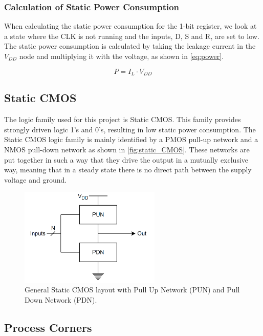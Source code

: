\subsubsection{Calculation of Static Power Consumption}
When calculating the static power consumption for the 1-bit register, we look at a state where the CLK is not running and the inputs, D, S and R, are set to low. The static power consumption is calculated by taking the leakage current in the $V_{DD}$ node and multiplying it with the voltage, as shown in \autoref{eq:power}.

\begin{equation}
    \label{eq:power}
    P = I_L \cdot V_{DD}
\end{equation}

\subsection{Static CMOS}\label{subsec:static_cmos}

The logic family used for this project is Static CMOS. This family provides strongly driven logic 1's and 0's, resulting in low static power consumption. The Static CMOS logic family is mainly identified by a PMOS pull-up network and a NMOS pull-down network as shown in \autoref{fig:static_CMOS}. These networks are put together in such a way that they drive the output in a mutually exclusive way, meaning that in a steady state there is no direct path between the supply voltage and ground. 

\begin{figure}[H]
    \centering
    \includegraphics[width=0.6\textwidth]{Figures/Pull_UP_DOWN.png}
    \caption{General Static CMOS layout with Pull Up Network (PUN) and Pull Down Network (PDN).}
    \label{fig:static_CMOS}
\end{figure}


\subsection{Process Corners}
\label{subsec:corners}

